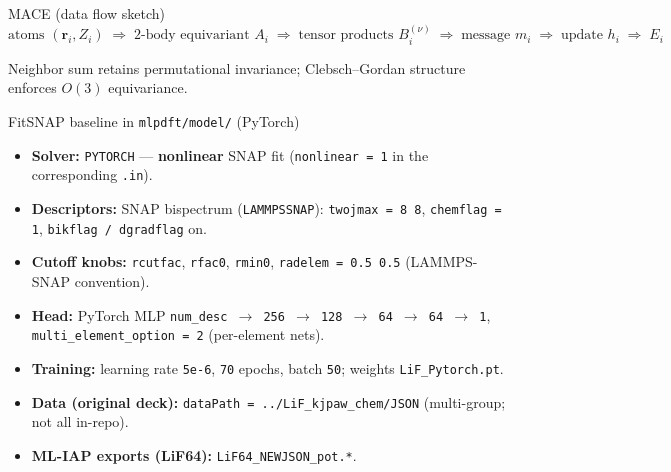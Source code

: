 \documentclass[aspectratio=169]{beamer}
\begin{document}
\begin{frame}{MACE (data flow sketch)}
  \[
    \text{atoms } (\mathbf r_i, Z_i)
    \;\Rightarrow\;
    \text{2-body equivariant } A_i
    \;\Rightarrow\;
    \text{tensor products } B_i^{(\nu)}
    \;\Rightarrow\;
    \text{message } m_i
    \;\Rightarrow\;
    \text{update } h_i
    \;\Rightarrow\;
    E_i
  \]
  \vfill
  \begin{center}
    \small
    Neighbor sum retains permutational invariance; Clebsch--Gordan structure enforces $O(3)$ equivariance.
  \end{center}
\end{frame}

\begin{frame}{FitSNAP baseline in \texttt{mlpdft/model/} (PyTorch)}
  \begin{itemize}
    \item \textbf{Solver:} \texttt{PYTORCH} --- \textbf{nonlinear} SNAP fit (\texttt{nonlinear = 1} in the corresponding \texttt{.in}).
    \item \textbf{Descriptors:} SNAP bispectrum (\texttt{LAMMPSSNAP}): \texttt{twojmax = 8 8}, \texttt{chemflag = 1}, \texttt{bikflag / dgradflag} on.
    \item \textbf{Cutoff knobs:} \texttt{rcutfac}, \texttt{rfac0}, \texttt{rmin0}, \texttt{radelem = 0.5 0.5} (LAMMPS-SNAP convention).
    \item \textbf{Head:} PyTorch MLP \texttt{num\_desc $\to$ 256 $\to$ 128 $\to$ 64 $\to$ 64 $\to$ 1}, \texttt{multi\_element\_option = 2} (per-element nets).
    \item \textbf{Training:} learning rate \texttt{5e-6}, \texttt{70} epochs, batch \texttt{50}; weights \texttt{LiF\_Pytorch.pt}.
    \item \textbf{Data (original deck):} \texttt{dataPath = ../LiF\_kjpaw\_chem/JSON} (multi-group; not all in-repo).
    \item \textbf{ML-IAP exports (LiF64):} \texttt{LiF64\_NEWJSON\_pot.*}.
  \end{itemize}
\end{frame}
\end{document}
